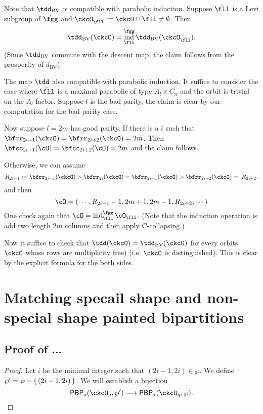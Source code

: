\documentclass[12pt,a4paper]{amsart}
\DeclareMathOperator{\ind}{ind}
\numberwithin{equation}{section}
\theoremstyle{remark}
\def\dBV{d_{\mathrm{BV}}}
\def\PBP{\mathsf{PBP}}
\def\ckfgg{{\check \fgg}}
\def\tdBV{\tdd_{\text{BV}}}
\def\sP{\wp}
\begin{document}
{Note that $\tdBV$ is compatible with parabolic induction.
Suppose $\ckfll$ is a Levi subgroup of $\ckfgg$ and
$\ckcO_{\ckfll}:=\ckcO\cap \ckfll\neq \emptyset$.
Then
\[
\tdBV(\ckcO) = \ind_{\fll}^{\fgg} \tdBV(\ckcO_{\ckfll}).
\]
(Since $\tdBV$ commute with the descent map, the claim follows from the
prosperity of $\dBV$)

The map $\tdd$ also compatible with parabolic induction.
It suffice to consider the case where $\ckfll$ is a maximal parabolic of type
$A_{l}\times C_{n}$ and
the orbit is trivial on the $A_{l}$ factor.
Suppose $l$ is the bad parity, the claim is clear by our computation for the bad
parity case.

Now suppose $l=2m$ has good parity. If there is a $i$ such that
$\bfrr_{2i+1}(\ckcO)=\bfrr_{2i+2}(\ckcO)=2m$. Then
$\bfcc_{2i+1}(\cO)=\bfcc_{2i+2}(\cO)=2m$ and the claim follows.

Otherwise, we can assume
\[
R_{2i-1}:=\bfrr_{2i-1}(\ckcO)> \bfrr_{2i}(\ckcO)=\bfrr_{2i+1}(\ckcO) > \bfrr_{2i+2}(\ckcO)=:R_{2i+2}.
\]
and then
\[
\cO = (\cdots, R_{2i-1}-1, 2m+1, 2m-1, R_{2i+2}, \cdots)
\]
One check again that $\cO = \ind_{\fll}^{\fgg}\cO_{\fll}$.
(Note that the induction operation is add two length $2m$ columns and then apply
C-collapsing.)

Now it suffice to check that
$\tdd(\ckcO) = \tdBV(\ckcO)$ for every orbits $\ckcO$ whose
rows are multiplicity free) (i.e. $\ckcO$ is distinguished).
This is clear by the explicit formula for the both sides.
}

\section{Matching specail shape and non-special shape painted bipartitions}
\label{app:comb}

\subsection{Proof of ...}
\begin{proof}
  Let $i$ be the minimal integer such that $(2i-1, 2i)\in \sP$.
  We define $\sP' = \sP - \set{(2i-1,2i)}$.
  We will establish a bijection
  \[
    \PBP_{\star}(\ckcO_{g}, \sP')\longrightarrow \PBP_{\star}(\ckcO_{g},\sP).
  \]
\end{proof}

\end{document}
